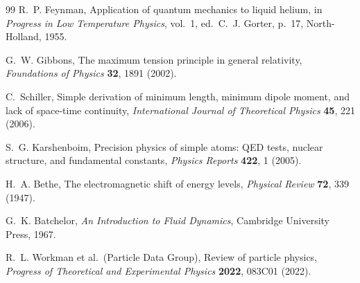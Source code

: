 \documentclass[aps,pra,preprint,longbibliography,nofootinbib]{revtex4-2}
\begin{document}
\begin{thebibliography}{99}
R.~P. Feynman,
Application of quantum mechanics to liquid helium,
in \textit{Progress in Low Temperature Physics}, vol.~1,
ed.\ C.~J. Gorter, p.~17, North-Holland, 1955.

G.~W. Gibbons,
The maximum tension principle in general relativity,
\textit{Foundations of Physics} \textbf{32}, 1891 (2002).

C.~Schiller,
Simple derivation of minimum length, minimum dipole moment, and
lack of space-time continuity,
\textit{International Journal of Theoretical Physics} \textbf{45},
221 (2006).

S.~G. Karshenboim,
Precision physics of simple atoms: QED tests, nuclear structure, and
fundamental constants,
\textit{Physics Reports} \textbf{422}, 1 (2005).

H.~A. Bethe,
The electromagnetic shift of energy levels,
\textit{Physical Review} \textbf{72}, 339 (1947).

G.~K. Batchelor,
\textit{An Introduction to Fluid Dynamics},
Cambridge University Press, 1967.

R.~L. Workman et al.\ (Particle Data Group),
Review of particle physics,
\textit{Progress of Theoretical and Experimental Physics}
\textbf{2022}, 083C01 (2022).

\end{thebibliography}
\end{document}
